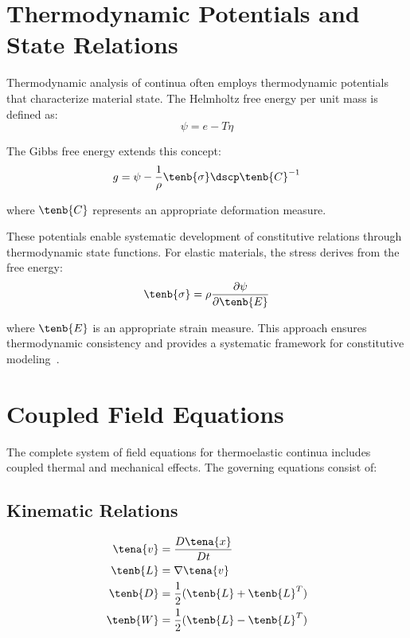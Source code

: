 \section{Thermodynamic Potentials and State Relations}

Thermodynamic analysis of continua often employs thermodynamic potentials that characterize material state. The Helmholtz free energy per unit mass is defined as:
\begin{equation}
\psi = e - T\eta
\end{equation}

The Gibbs free energy extends this concept:
\begin{equation}
g = \psi - \frac{1}{\rho}\tenb{\sigma} \dscp \tenb{C}^{-1}
\end{equation}

where $\tenb{C}$ represents an appropriate deformation measure.

These potentials enable systematic development of constitutive relations through thermodynamic state functions. For elastic materials, the stress derives from the free energy:
\begin{equation}
\tenb{\sigma} = \rho \frac{\partial \psi}{\partial \tenb{E}}
\end{equation}

where $\tenb{E}$ is an appropriate strain measure. This approach ensures thermodynamic consistency and provides a systematic framework for constitutive modeling~\autocite{Sadd.2019}.

\section{Coupled Field Equations}

The complete system of field equations for thermoelastic continua includes coupled thermal and mechanical effects. The governing equations consist of:

\subsection{Kinematic Relations}
\begin{align}
\tena{v} &= \frac{D\tena{x}}{Dt}\\
\tenb{L} &= \nabla \tena{v}\\
\tenb{D} &= \frac{1}{2}(\tenb{L} + \tenb{L}^T)\\
\tenb{W} &= \frac{1}{2}(\tenb{L} - \tenb{L}^T)
\end{align}

